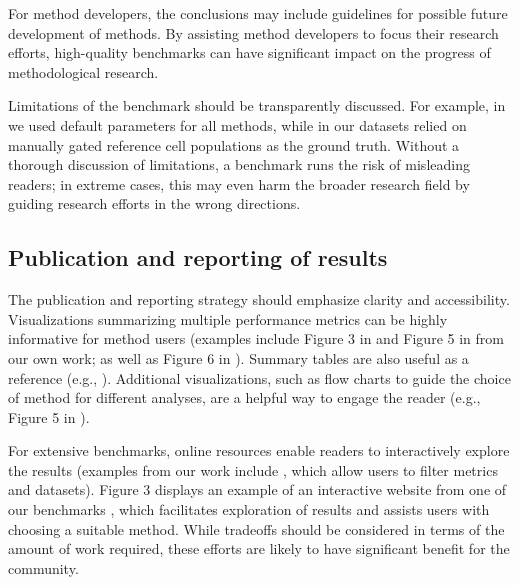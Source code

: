 For method developers, the conclusions may include guidelines for possible future development of methods. By assisting method developers to focus their research efforts, high-quality benchmarks can have significant impact on the progress of methodological research.

Limitations of the benchmark should be transparently discussed. For example, in \cite{saelens_comparisonsinglecelltrajectory_2019} we used default parameters for all methods, while in \cite{weber_comparisonclusteringmethods_2016} our datasets relied on manually gated reference cell populations as the ground truth. Without a thorough discussion of limitations, a benchmark runs the risk of misleading readers; in extreme cases, this may even harm the broader research field by guiding research efforts in the wrong directions.

\subsection{Publication and reporting of results}

The publication and reporting strategy should emphasize clarity and accessibility. Visualizations summarizing multiple performance metrics can be highly informative for method users (examples include Figure 3 in \cite{saelens_comparisonsinglecelltrajectory_2019} and Figure 5 in \cite{soneson_biasrobustnessscalability_2018} from our own work; as well as Figure 6 in \cite{korthauer_practicalguidemethods_2019}). Summary tables are also useful as a reference (e.g., \cite{weber_comparisonclusteringmethods_2016,aghaeepour_criticalassessmentautomated_2013}). Additional visualizations, such as flow charts to guide the choice of method for different analyses, are a helpful way to engage the reader (e.g., Figure 5 in \cite{saelens_comparisonsinglecelltrajectory_2019}).

For extensive benchmarks, online resources enable readers to interactively explore the results (examples from our work include \cite{saelens_comparisonsinglecelltrajectory_2019, weber_comparisonclusteringmethods_2016}, which allow users to filter metrics and datasets). Figure 3 displays an example of an interactive website from one of our benchmarks \cite{saelens_comparisonsinglecelltrajectory_2019}, which facilitates exploration of results and assists users with choosing a suitable method. While tradeoffs should be considered in terms of the amount of work required, these efforts are likely to have significant benefit for the community.

